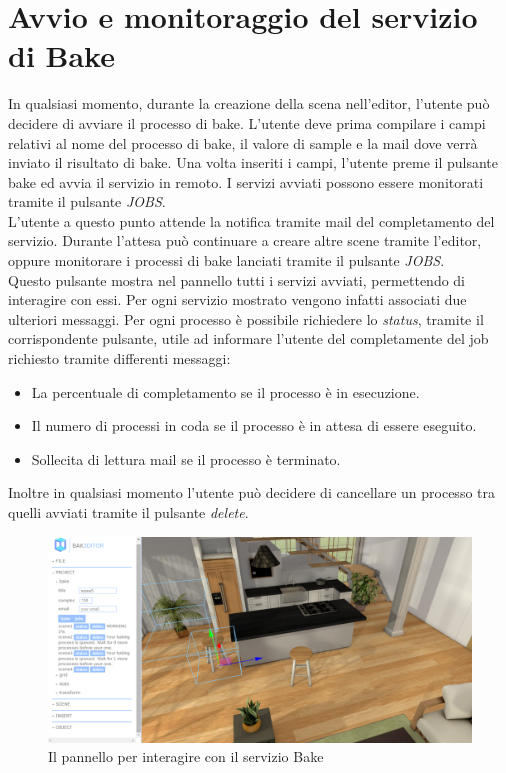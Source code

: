 \section{Avvio e monitoraggio del servizio di Bake}
\label{sec:chapter_caso_uso_section_2}

In qualsiasi momento, durante la creazione della scena nell’editor, l’utente può decidere di avviare il processo di bake.
L’utente deve prima compilare i campi relativi al nome del processo di bake, il valore di sample e la mail dove verrà inviato il risultato di bake.
Una volta inseriti i campi, l’utente preme il pulsante bake ed avvia il servizio in remoto.
I servizi avviati possono essere monitorati tramite il pulsante \emph{JOBS}.
\\
L’utente a questo punto attende la notifica tramite mail del completamento del servizio.
Durante l’attesa può continuare a creare altre scene tramite l’editor, oppure monitorare i processi di bake lanciati tramite il pulsante \emph{JOBS}.
\\
Questo pulsante mostra nel pannello tutti i servizi avviati, permettendo di interagire con essi. Per ogni servizio mostrato vengono infatti associati due ulteriori messaggi.
Per ogni processo è possibile richiedere lo \emph{status}, tramite il corrispondente pulsante, utile ad informare l’utente del completamente del job richiesto tramite differenti messaggi:
\begin{itemize}
\item La percentuale di completamento se il processo è in esecuzione.
\item Il numero di processi in coda se il processo è in attesa di essere eseguito.
\item Sollecita di lettura mail se il processo è terminato.
\end{itemize}
Inoltre in qualsiasi momento l’utente può decidere di cancellare un processo tra quelli avviati tramite il pulsante \emph{delete}.
\\
\begin{figure}[htb]
 \centering
 \includegraphics[width=1\linewidth]{images/chapter_caso_uso/service_bake.png}\hfill
 \caption[Pannello di interazione con il servizio]{Il pannello per interagire con il servizio Bake}
 \label{fig:caso_uso_service_bake}
\end{figure}